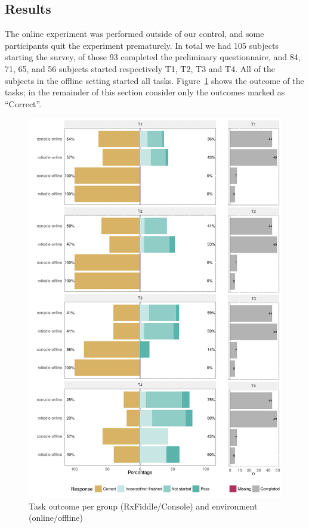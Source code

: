 \subsection{Results} The online experiment was performed outside of our
control, and some participants quit the experiment prematurely.  In
total we had 105 subjects starting the survey, of those 93 completed the
preliminary questionnaire, and 84, 71, 65, and 56 subjects started
respectively T1, T2, T3 and T4.  All of the subjects in the offline
setting started all tasks.  Figure~\ref{fig:resultPerTask} 
shows the outcome of the tasks; in the remainder
of this section consider only the outcomes marked as ``Correct''.

\begin{figure}[t]
    \includegraphics[width=\columnwidth]{images/resultPerTask.pdf}
    \caption{Task outcome per group (RxFiddle/Console) and environment (online/offline)}
    \label{fig:resultPerTask}
\end{figure}

